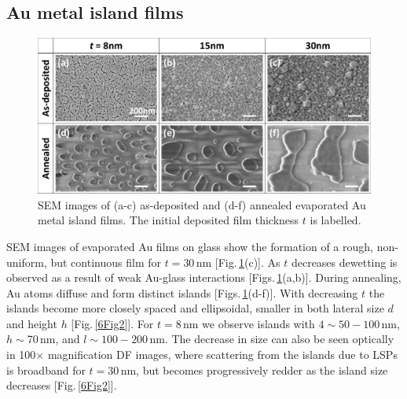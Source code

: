 \subsection{Au metal island films}
\begin{figure}[h!] 
\centering    
\includegraphics[width=\textwidth]{Fig1}
\caption{SEM images of (a-c) as-deposited and (d-f) annealed evaporated Au metal island films. The initial deposited film thickness $t$ is labelled.}
\label{6Fig1}
\end{figure}
SEM images of evaporated Au films on glass show the formation of a rough, non-uniform, but continuous film for $t=30$\,nm [Fig.\,\ref{6Fig1}(c)]. As $t$ decreases dewetting is observed as a result of weak Au-glass interactions [Figs.\,\ref{6Fig1}(a,b)]. During annealing, Au atoms diffuse and form distinct islands [Figs.\,\ref{6Fig1}(d-f)]. With decreasing $t$ the islands become more closely spaced and ellipsoidal, smaller in both lateral size $d$ and height $h$ [Fig.\,\ref{6Fig2}]. For $t=8$\,nm we observe islands with $4 \sim 50-100$\,nm, $h\sim$70\,nm, and $l \sim 100-200$\,nm. The decrease in size can also be seen optically in 100$\times$ magnification DF images, where scattering from the islands due to LSPs is broadband for $t=30$\,nm, but becomes progressively redder as the island size decreases [Fig.\,\ref{6Fig2}]. 

